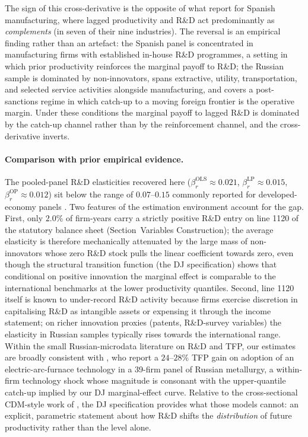 \documentclass[a4paper, 12pt]{article}
\begin{document}
The sign of this cross-derivative is the opposite of what \textcite{doraszelski2013r} report for Spanish manufacturing, where lagged productivity and R\&D act predominantly as \emph{complements} (in seven of their nine industries). The reversal is an empirical finding rather than an artefact: the Spanish panel is concentrated in manufacturing firms with established in-house R\&D programmes, a setting in which prior productivity reinforces the marginal payoff to R\&D; the Russian sample is dominated by non-innovators, spans extractive, utility, transportation, and selected service activities alongside manufacturing, and covers a post-sanctions regime in which catch-up to a moving foreign frontier is the operative margin. Under these conditions the marginal payoff to lagged R\&D is dominated by the catch-up channel rather than by the reinforcement channel, and the cross-derivative inverts.

\paragraph{Comparison with prior empirical evidence.} The pooled-panel R\&D elasticities recovered here ($\beta_r^{\text{OLS}} \approx 0.021$, $\beta_r^{\text{LP}} \approx 0.015$, $\beta_r^{\text{OP}} \approx 0.012$) sit below the range of $0.07$--$0.15$ commonly reported for developed-economy panels \parencite{Pieri2018Modelling, Kancs2016R&D}. Two features of the estimation environment account for the gap. First, only $2.0\%$ of firm-years carry a strictly positive R\&D entry on line 1120 of the statutory balance sheet (Section~Variables Construction); the average elasticity is therefore mechanically attenuated by the large mass of non-innovators whose zero R\&D stock pulls the linear coefficient towards zero, even though the structural transition function (the DJ specification) shows that conditional on positive innovation the marginal effect is comparable to the international benchmarks at the lower productivity quantiles. Second, line 1120 itself is known to under-record R\&D activity because firms exercise discretion in capitalising R\&D as intangible assets or expensing it through the income statement; on richer innovation proxies (patents, R\&D-survey variables) the elasticity in Russian samples typically rises towards the international range. Within the small Russian-microdata literature on R\&D and TFP, our estimates are broadly consistent with \textcite{malein2019total}, who report a $24$--$28\%$ TFP gain on adoption of an electric-arc-furnace technology in a 39-firm panel of Russian metallurgy, a within-firm technology shock whose magnitude is consonant with the upper-quantile catch-up implied by our DJ marginal-effect curve. Relative to the cross-sectional CDM-style work of \textcite{crepon1998research}, the DJ specification provides what those models cannot: an explicit, parametric statement about how R\&D shifts the \emph{distribution} of future productivity rather than the level alone.
\end{document}
